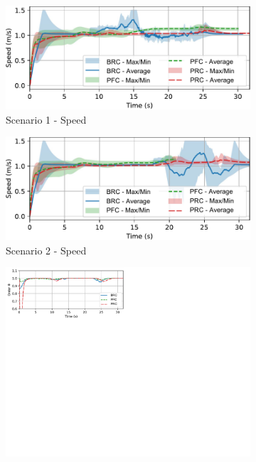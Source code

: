 \begin{figure}
    \centering
    \begin{subfigure}[b]{0.495\textwidth}
    \includegraphics[width=\textwidth]{paper3/images/velocity_scen1.pdf}
    \caption{Scenario 1 - Speed}
    \label{fig:speed1}
    \end{subfigure}
    \begin{subfigure}[b]{0.495\textwidth}
    \includegraphics[width=\textwidth]{paper3/images/velocity_scen2.pdf}
    \caption{Scenario 2 - Speed}
    \label{fig:speed2}
    \end{subfigure}
    \begin{subfigure}[b]{0.495\textwidth}
    \includegraphics[width=\textwidth]{paper3/images/order_scen1.pdf}

\end{subfigure}
\end{figure}
